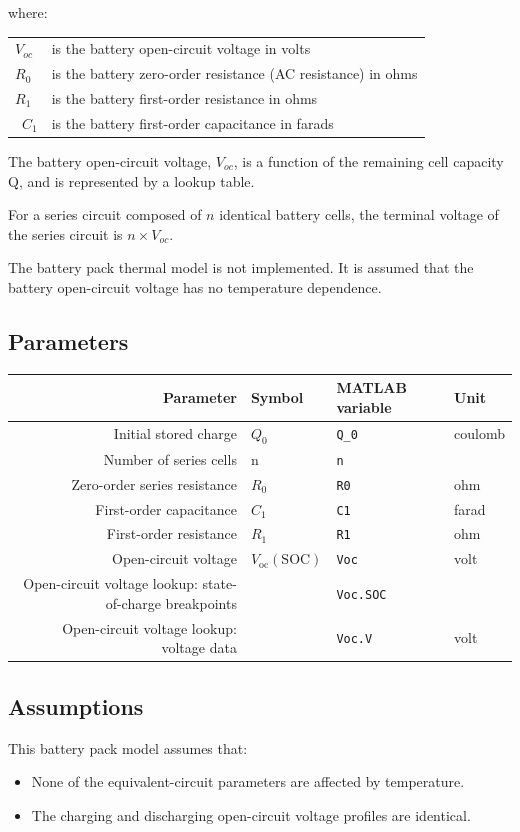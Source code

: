 \documentclass[../SimBALink.tex]{subfiles}
\begin{document}
		where:
		\begin{center}
		\begin{tabular}{l l}
			$V_{oc}$		&	is the battery open-circuit voltage in volts	\\
			$R_{0}$		&	is the battery zero-order resistance (AC resistance) in ohms \\
			$R_{1}$		& 	is the battery first-order resistance in ohms \\\
			$C_{1}$		&	is the battery first-order capacitance in farads \\
		\end{tabular}
		\end{center}
		
		The battery open-circuit voltage, $V_{oc}$, is a function of the remaining cell capacity Q, and is represented by a lookup table.
		
		For a series circuit composed of $n$ identical battery cells, the terminal voltage of the series circuit is $n \times V_{oc}$.
		
		The battery pack thermal model is not implemented. It is assumed that the battery open-circuit voltage has no temperature dependence.
		

\subsection{Parameters}
	\begin{tabular}{ r | l | l | l }
		Parameter				&	Symbol				&	MATLAB variable	&	Unit						\\	\hline	
		Initial stored charge			&	$Q_0$				&	\texttt{Q\_0}		&	coulomb					\\
		Number of series cells		&	n					&	\texttt{n}			&							\\
		Zero-order series resistance	&	$R_0$				&	\texttt{R0}			&	ohm						\\
		First-order capacitance		&	$C_1$				&	\texttt{C1}			&	farad					\\
		First-order resistance		&	$R_1$				&	\texttt{R1}			&	ohm						\\
		Open-circuit voltage			&	$V_\text{oc}(\text{SOC})$&	\texttt{Voc}		&	volt						\\
		Open-circuit voltage lookup: state-of-charge breakpoints	&		&	\texttt{Voc.SOC}	&							\\
		Open-circuit voltage lookup: voltage data	&			&	\texttt{Voc.V}		& 	volt
	\end{tabular}

\subsection{Assumptions}
	This battery pack model assumes that:
	
	\begin{itemize}
		\item		None of the equivalent-circuit parameters are affected by temperature.		
		\item		The charging and discharging open-circuit voltage profiles are identical.	
	\end{itemize}	
\end{document}
